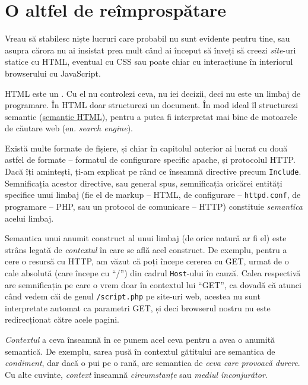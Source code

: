 \section{O altfel de reîmprospătare}

Vreau să stabilesc niște lucruri care probabil nu sunt evidente
pentru tine, sau asupra cărora nu ai insistat prea mult
când ai început să înveți să creezi \textit{site}-uri statice
cu HTML, eventual cu CSS sau poate chiar cu interacțiune
în interiorul browserului cu JavaScript.

HTML este un .
Cu el nu controlezi ceva, nu iei decizii, deci nu este
un limbaj de programare. În HTML doar
structurezi un document. În mod ideal îl structurezi
semantic (\href{http://en.wikipedia.org/wiki/Semantic_HTML}{semantic HTML}),
pentru a putea fi interpretat mai bine de motoarele de căutare web
(en. \textsl{search engine}).

Există multe formate de fișiere, și chiar în capitolul anterior ai
lucrat cu două astfel de formate -- formatul de configurare specific apache, și protocolul
HTTP. Dacă îți amintești,
ți-am explicat pe rând ce înseamnă directive precum \texttt{Include}.
Semnificația acestor directive, sau general spus, semnificația oricărei
entități specifice unui limbaj (fie el de markup -- HTML, de configurare
-- \texttt{httpd.conf}, de programare -- PHP, sau un protocol de
comunicare -- HTTP) constituie \textsl{semantica}
acelui limbaj.

Semantica unui anumit construct al unui limbaj (de orice natură
ar fi el) este strâns legată de \textit{contextul} în care se află acel
construct.
De exemplu, pentru a cere o resursă cu HTTP, am văzut că
poți începe cererea cu GET, urmat
de o cale absolută (care începe cu ``/'') din cadrul \texttt{Host}-ului
în cauză. Calea respectivă are semnificația pe care o vrem
doar în contextul lui ``GET'', ca dovadă că atunci când vedem
căi de genul \texttt{/script.php} pe site-uri web,
acestea nu sunt interpretate automat ca parametri GET, și
deci browserul nostru nu este redirecționat către acele pagini.

\textsl{Contextul} a ceva înseamnă în ce punem acel ceva pentru a
avea o anumită semantică. De exemplu, sarea pusă în contextul
gătitului are semantica de \textit{condiment}, dar dacă
o pui pe o rană, are semantica de \textit{ceva care provoacă durere}.
Cu alte cuvinte, \textsl{context} înseamnă
\textsl{circumstanțe} sau \textsl{mediul înconjurător}. 


